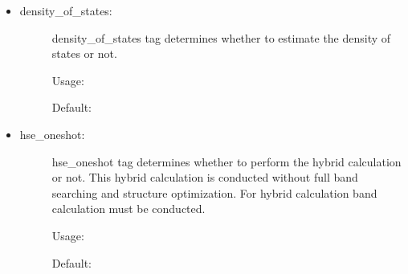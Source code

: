 \documentclass[letterpaper,10pt,english]{sphinxmanual}
\begin{document}
\begin{itemize}
\begin{description}
\end{description}

\item {} \begin{description}
\item[{density\_of\_states:}] \leavevmode
density\_of\_states tag determines whether to estimate the density of states or not.

Usage:

\begin{sphinxVerbatim}[commandchars=\\\{\}]
     
\end{sphinxVerbatim}

Default:

\begin{sphinxVerbatim}[commandchars=\\\{\}]
   
\end{sphinxVerbatim}

\end{description}

\item {} \begin{description}
\item[{hse\_oneshot:}] \leavevmode
hse\_oneshot tag determines whether to perform the hybrid calculation or not. This hybrid calculation
is conducted without full band searching and structure optimization. For hybrid calculation band calculation
must be conducted.

Usage:

\begin{sphinxVerbatim}[commandchars=\\\{\}]
     
\end{sphinxVerbatim}

Default:

\begin{sphinxVerbatim}[commandchars=\\\{\}]
   
\end{sphinxVerbatim}

\end{description}


\end{itemize}
\end{document}
